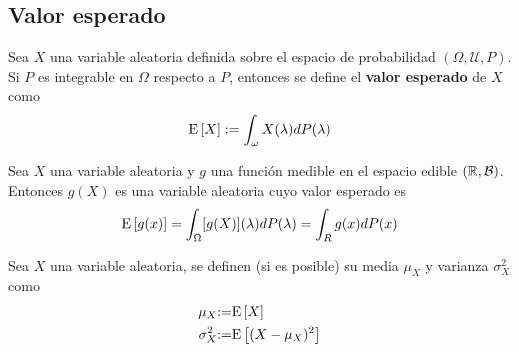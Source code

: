 %
%

\subsection{Valor esperado}

\begin{definicion}
Sea $X$ una variable aleatoria definida sobre el espacio de probabilidad $(\Omega, \mathcal{U}, P)$. Si $P$ es integrable en $\Omega$ respecto a $P$, entonces se define el \textbf{valor esperado} de $X$ como
\begin{equation}
\mathrm{E}\left[ X \right] := \int_\omega X(\lambda) dP(\lambda)
\end{equation}
\end{definicion}

\begin{proposicion}
Sea $X$ una variable aleatoria y $g$ una función medible en el espacio edible $(\mathbb{R},\mathcal{B})$. Entonces $g(X)$ es una variable aleatoria cuyo valor esperado es
\begin{equation}
\mathrm{E}\left[ g(x) \right] = \int_\Omega [g(X)](\lambda) dP(\lambda) = \int_R g(x) dP(x)
\end{equation}
\end{proposicion}

\begin{definicion}
Sea $X$ una variable aleatoria, se definen (si es posible) su media $\mu_X$ y varianza $\sigma_X^{2}$ como
\begin{align}
\mu_X &{:=} \mathrm{E}\left[ X \right] \\
\sigma_X^{2} &{:=} \mathrm{E}\left[ (X-\mu_X)^{2} \right]
\end{align}
\end{definicion}

